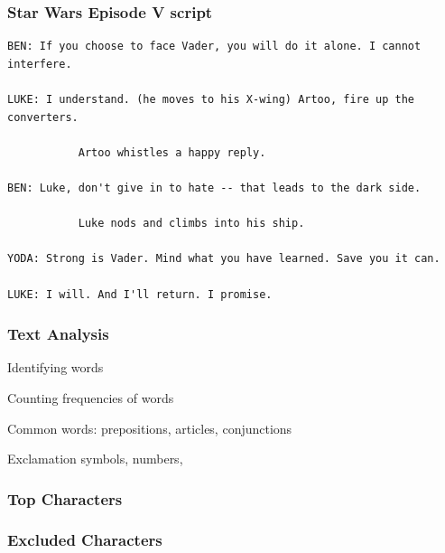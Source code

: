 \documentclass[12pt]{beamer}\usepackage[]{graphicx}\usepackage[]{color}
\begin{document}

\begin{frame}[fragile]
\frametitle{Star Wars Episode V script}

{\scriptsize
\begin{verbatim}
BEN: If you choose to face Vader, you will do it alone. I cannot
interfere.

LUKE: I understand. (he moves to his X-wing) Artoo, fire up the
converters.

           Artoo whistles a happy reply.

BEN: Luke, don't give in to hate -- that leads to the dark side.

           Luke nods and climbs into his ship.

YODA: Strong is Vader. Mind what you have learned. Save you it can.

LUKE: I will. And I'll return. I promise.
\end{verbatim}
}

\end{frame}


\begin{frame}
\frametitle{Text Analysis}

\bi
  \item Identifying words
  \item Counting frequencies of words
  \item Common words: prepositions, articles, conjunctions
  \item Exclamation symbols, numbers, 
\ei
\eb

\end{frame}


\begin{frame}
\frametitle{}
\begin{center}
\end{center}
\end{frame}


\begin{frame}
\frametitle{Top Characters}
\begin{center}
\end{center}
\end{frame}


\begin{frame}
\frametitle{Excluded Characters}
\begin{center}
\end{center}
\end{frame}

\end{document}
